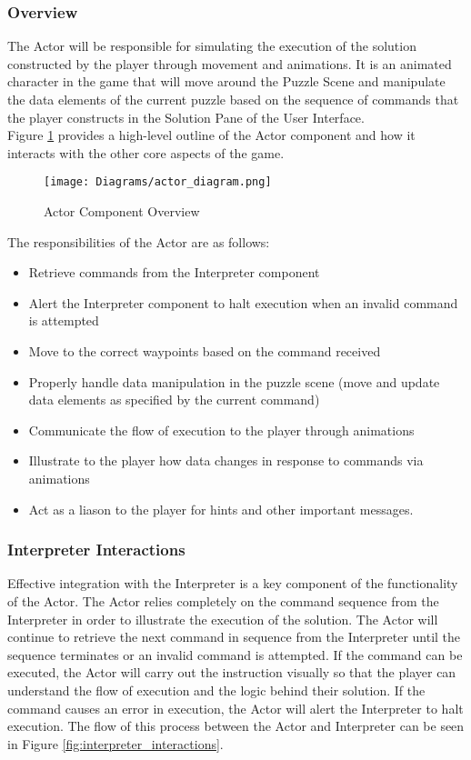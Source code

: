 \subsubsection{Overview}
The Actor will be responsible for simulating the execution of the solution constructed
by the player through movement and animations. It is an animated character in the game that will move around the Puzzle Scene and manipulate the data elements of the current puzzle based on the sequence of commands that the player constructs in the Solution Pane of the User Interface. \\

Figure \ref{fig:actor_diagram} provides a high-level outline of the Actor component and how it 
interacts with the other core aspects of the game.\\

\begin{figure}[!hb]
  \caption{Actor Component Overview}
  \label{fig:actor_diagram}
  \centering
  \texttt{[image: Diagrams/actor\_diagram.png]}
\end{figure}

The responsibilities of the Actor are as follows:

\begin{itemize}
	\item Retrieve commands from the Interpreter component
	\item Alert the Interpreter component to halt execution when an invalid command is attempted
	\item Move to the correct waypoints based on the command received
	\item Properly handle data manipulation in the puzzle scene (move and update data elements
			as specified by the current command)
	\item Communicate the flow of execution to the player through animations
	\item Illustrate to the player how data changes in response to commands via animations
	\item Act as a liason to the player for hints and other important messages.
\end{itemize}

\subsubsection{Interpreter Interactions}
Effective integration with the Interpreter is a key component of the functionality of the Actor. The Actor relies completely on the command sequence from the Interpreter in order to illustrate the execution of the solution. The Actor will continue to retrieve the next command in sequence from the Interpreter until the sequence terminates or an invalid command is attempted. If the command can be executed, the Actor will carry out the instruction visually so that the player can understand the flow of execution and the logic behind their solution. If the command causes an error in execution, the Actor will alert the Interpreter to halt execution. The flow of this process between the Actor and Interpreter can be seen in Figure \ref{fig:interpreter_interactions}.\\

